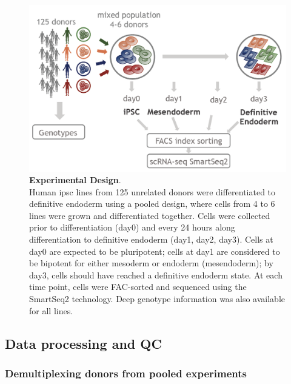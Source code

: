\begin{figure}[h]
\centering
\includegraphics[width=12cm]{Chapter4/Fig/endodiff_experimental_design.png}
\caption[Experimental Design]{\textbf{Experimental Design}.\\
Human \gls{ipsc} lines from 125 unrelated donors were differentiated to definitive endoderm using a pooled design, where cells from 4 to 6 lines were grown and differentiated together.
Cells were collected prior to differentiation (day0) and every 24 hours along differentiation to definitive endoderm (day1, day2, day3).
Cells at day0 are expected to be pluripotent; cells at day1 are considered to be bipotent for either mesoderm or endoderm (mesendoderm); by day3, cells should have reached a definitive endoderm state.
At each time point, cells were FAC-sorted and sequenced using the SmartSeq2 technology.
Deep genotype information was also available for all lines.}
\label{fig:endodiff_experimental_design}
\end{figure}


\subsection{Data processing and QC}
 

\subsubsection{Demultiplexing donors from pooled experiments} 

